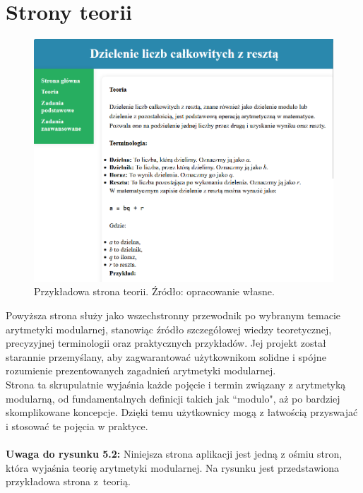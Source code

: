 \documentclass{SGGW-thesis}
\begin{document}
	\section{Strony teorii}
	\begin{figure}[h]
		\centering
		\includegraphics[width=1\textwidth]{teoria.png}
		\caption{Przykładowa strona teorii. Źródło: opracowanie własne.}
		\label{fig:teoria}
	\end{figure}
	\vspace{1em}
	\noindent Powyższa strona służy jako wszechstronny przewodnik po wybranym temacie arytmetyki modularnej, stanowiąc źródło szczegółowej wiedzy teoretycznej, precyzyjnej terminologii oraz praktycznych przykładów. Jej projekt został starannie przemyślany, aby zagwarantować użytkownikom solidne i spójne rozumienie prezentowanych zagadnień arytmetyki modularnej.
	\\
	Strona ta skrupulatnie wyjaśnia każde pojęcie i termin związany z arytmetyką modularną, od fundamentalnych definicji takich jak ``modulo", aż po bardziej skomplikowane koncepcje. Dzięki temu użytkownicy mogą z łatwością przyswajać i stosować te pojęcia w praktyce.
	\\
	\\
	\noindent \textbf{Uwaga do rysunku 5.2:} Niniejsza strona aplikacji jest jedną z ośmiu stron, która wyjaśnia teorię arytmetyki modularnej. Na rysunku jest przedstawiona przykładowa strona z~teorią.
	\newpage
	
\end{document}
